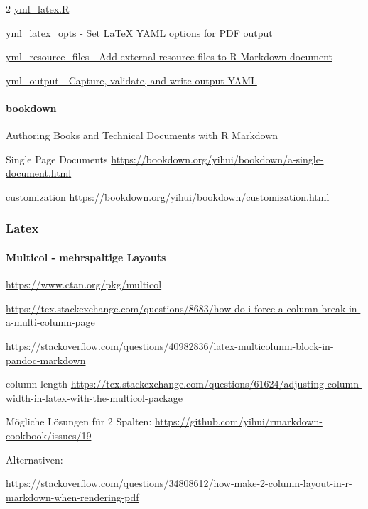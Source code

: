 \documentclass[
  a4paper,
  twoside]{article}
\let\oldparagraph\paragraph
\renewcommand{\paragraph}[1]{\oldparagraph{#1}\mbox{}}
\begin{document}
\begin {multicols}{2}
\href{https://github.com/r-lib/ymlthis/blob/master/R/yml_latex.R}{yml\_latex.R}

\href{https://rdrr.io/github/r-lib/ymlthis/man/yml_latex_opts.html}{yml\_latex\_opts - Set LaTeX YAML options for PDF output}

\href{https://www.rdocumentation.org/packages/ymlthis/versions/0.1.2/topics/yml_resource_files}{yml\_resource\_files - Add external resource files to R Markdown document}

\href{https://github.com/r-lib/ymlthis/blob/master/R/yml_output.R}{yml\_output - Capture, validate, and write output YAML}

\hypertarget{bookdown}{%
\paragraph{bookdown}\label{bookdown}}

Authoring Books and Technical Documents with R Markdown

Single Page Documents \url{https://bookdown.org/yihui/bookdown/a-single-document.html}

customization \url{https://bookdown.org/yihui/bookdown/customization.html}

\hypertarget{latex}{%
\subsubsection{Latex}\label{latex}}

\hypertarget{multicol---mehrspaltige-layouts}{%
\paragraph{Multicol - mehrspaltige Layouts}\label{multicol---mehrspaltige-layouts}}

\url{https://www.ctan.org/pkg/multicol}

\url{https://tex.stackexchange.com/questions/8683/how-do-i-force-a-column-break-in-a-multi-column-page}

\url{https://stackoverflow.com/questions/40982836/latex-multicolumn-block-in-pandoc-markdown}

column length
\url{https://tex.stackexchange.com/questions/61624/adjusting-column-width-in-latex-with-the-multicol-package}

Mögliche Lösungen für 2 Spalten:
\url{https://github.com/yihui/rmarkdown-cookbook/issues/19}

Alternativen:

\url{https://stackoverflow.com/questions/34808612/how-make-2-column-layout-in-r-markdown-when-rendering-pdf}


\end{multicols}
\end{document}
